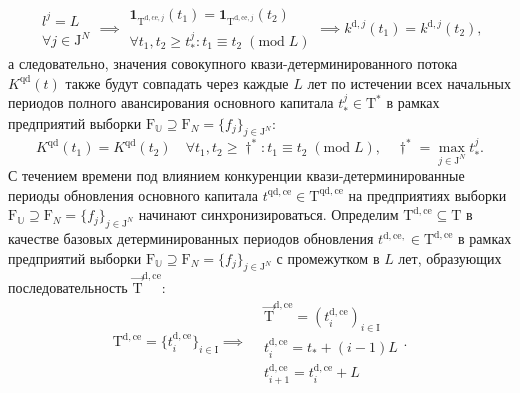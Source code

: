 \begin{equation}\begin{aligned} l^{j} = L \\ \forall j \in \mathrm{J}^{N} \end{aligned} \implies \begin{aligned} \mathbf{1}_{\mathrm{T}^{\mathrm{d,ce},j}}(t_{1}) = \mathbf{1}_{\mathrm{T}^{\mathrm{d,ce},j}}(t_{2}) \\ \forall t_{1}, t_{2} \geq t^{j}_{*} : t_{1} \equiv t_{2} \; (\mathrm{mod} \; L) \end{aligned} \implies k^{\mathrm{d},j}(t_{1}) = k^{\mathrm{d},j}(t_{2}),\end{equation}
а следовательно, значения совокупного квази-детерминированного потока $K^{\mathrm{qd}}(t)$ также будут совпадать через каждые $L$ лет по истечении всех начальных периодов полного авансирования основного капитала $t^{j}_{*} \in \mathrm{T}^{*}$ в рамках предприятий выборки $\mathrm{F}_{\mathbb{U}} \supseteq \mathrm F_N = \{f_j\}_{j \in \mathrm{J}^{N}}$:
\begin{equation}K^{\mathrm{qd}}(t_{1}) = K^{\mathrm{qd}}(t_{2}) \quad \forall t_{1}, t_{2} \geq \dagger^{*} : t_{1} \equiv t_{2} \; (\mathrm{mod} \; L), \quad \dagger^{*} = \max_{j \in \mathrm{J}^{N}}t^{j}_{*}.\end{equation}
С течением времени под влиянием конкуренции квази-детерминированные периоды обновления основного капитала $t^{\mathrm{qd,ce}} \in \mathrm{T}^{\mathrm{qd,ce}}$ на предприятиях выборки $\mathrm{F}_{\mathbb{U}} \supseteq \mathrm F_N = \{f_j\}_{j \in \mathrm{J}^{N}}$ начинают синхронизироваться. Определим $\mathrm{T}^{\mathrm{d,ce}} \subseteq \mathrm{T}$ в качестве базовых детерминированных периодов обновления $t^{\mathrm{d,ce},} \in \mathrm{T}^{\mathrm{d,ce}}$ в рамках предприятий выборки $\mathrm{F}_{\mathbb{U}} \supseteq \mathrm F_N = \{f_j\}_{j \in \mathrm{J}^{N}}$ с промежутком в $L$ лет, образующих последовательность $\overrightarrow{\mathrm{T}}^{\mathrm{d,ce}}$:
\begin{equation}\mathrm{T}^{\mathrm{d,ce}} = \{t^{\mathrm{d,ce}}_{i}\}_{i \in \mathrm{I}} \implies \begin{aligned} &\overrightarrow{\mathrm{T}}^{\mathrm{d,ce}} = (t^{\mathrm{d,ce}}_{i})_{i \in \mathrm{I}} \\ &t^{\mathrm{d,ce}}_{i} = t_{*} + (i-1)L \\ &t^{\mathrm{d,ce}}_{i+1} = t^{\mathrm{d,ce}}_{i} + L \end{aligned}.\end{equation}
